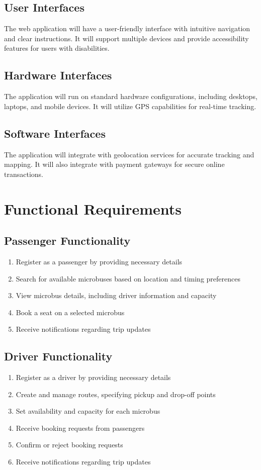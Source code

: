 \documentclass{BusMateSRS}
\begin{document}
\subsection{User Interfaces}
The web application will have a user-friendly interface with intuitive 
navigation and clear instructions. It will support multiple devices and 
provide accessibility features for users with disabilities.

\subsection{Hardware Interfaces}
The application will run on standard hardware configurations, 
including desktops, laptops, and mobile devices. 
It will utilize GPS capabilities for real-time tracking.

\subsection{Software Interfaces}
The application will integrate with geolocation services for accurate tracking 
and mapping. It will also integrate with payment gateways for secure online 
transactions.

\section{Functional Requirements}
\subsection{Passenger Functionality}
\begin{enumerate}
  \item Register as a passenger by providing necessary details
  \item Search for available microbuses based on location and timing preferences
  \item View microbus details, including driver information and capacity
  \item Book a seat on a selected microbus
  \item Receive notifications regarding trip updates
\end{enumerate}

\subsection{Driver Functionality}
\begin{enumerate}
  \item Register as a driver by providing necessary details
  \item Create and manage routes, specifying pickup and drop-off points
  \item Set availability and capacity for each microbus
  \item Receive booking requests from passengers
  \item Confirm or reject booking requests
  \item Receive notifications regarding trip updates
\end{enumerate}
\end{document}
